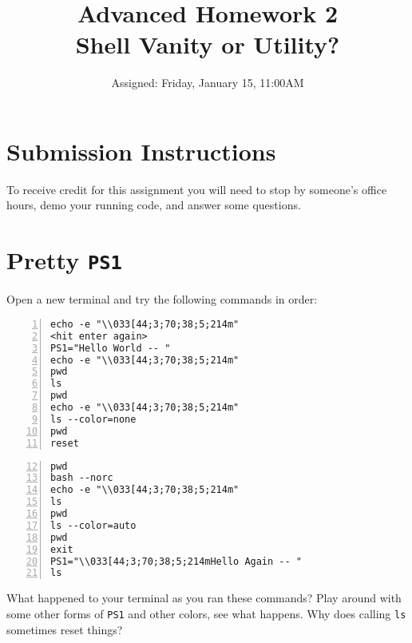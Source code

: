 \documentclass{article}
\begin{document}
\fancyfoot[C]{\thepage~/~\pageref*{LastPage}}
\pagestyle{fancyplain}


\title{\textbf{Advanced Homework 2\\Shell Vanity or Utility?}}
\author{Assigned: Friday, January 15, 11:00AM}
\date{\textbf{\color{red}{Due: Before the end of the final office hours this week (Thursday, $\sim$8:15PM)}}}
\maketitle


\section*{Submission Instructions}
To receive credit for this assignment you will need to stop by someone's
office hours, demo your running code, and answer some questions.

\section{Pretty \texttt{PS1}}

Open a new terminal and try the following commands in order:

\begin{minipage}[t]{0.5\textwidth}
\begin{lstlisting}[numbers=left]
echo -e "\\033[44;3;70;38;5;214m"
<hit enter again>
PS1="Hello World -- "
echo -e "\\033[44;3;70;38;5;214m"
pwd
ls
pwd
echo -e "\\033[44;3;70;38;5;214m"
ls --color=none
pwd
reset
\end{lstlisting}
\end{minipage}
\begin{minipage}[t]{0.5\textwidth}
  \begin{lstlisting}[numbers=left,firstnumber=12]
pwd
bash --norc
echo -e "\\033[44;3;70;38;5;214m"
ls
pwd
ls --color=auto
pwd
exit
PS1="\\033[44;3;70;38;5;214mHello Again -- "
ls
\end{lstlisting}
\end{minipage}

\noindent
What happened to your terminal as you ran these commands?
Play around with some other forms of \texttt{PS1} and other colors, see what
happens. Why does calling \texttt{ls} sometimes reset things?
\end{document}
